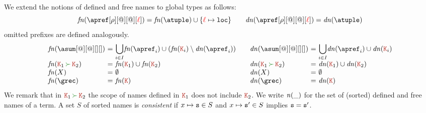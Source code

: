 We extend the notions of defined and free names to global types as
follows:
\[
 \fn{\apref[\arole][@][@][\alocvar]}
 = \fn \atuple \cup \{\alocvar \mapsto \asort[loc]\} 
\qquad
 \dn{\apref[\arole][@][@][\alocvar]} 
 = \dn \atuple 
\]
omitted prefixes are defined analogously.
\[
  \begin{array}{ll}
    \begin{array}{l@{\ =\ } ll}
      \fn{\asum[@][@][][]} & \displaystyle{\bigcup_{i\in I}} \fn{\apref_i} \cup (\fn{\aK_i}\setminus\dn{\apref_i})
      \\
      \fn{\aK_1 \seqop \aK_2} 
                &
                  \fn{\aK_1}\cup\fn{\aK_2}
      \\
      \fn X & \emptyset
      \\
      \fn \grec & \fn {\aK}
    \end{array}
    &
    \begin{array}{l@{\ =\ } ll}
      \dn{\asum[@][@][][]} & \displaystyle{\bigcup_{i\in I}} \dn{\apref_i} \cup \dn{\aK_i}
      \\
      \dn{\aK_1 \seqop \aK_2} 
                           &
                             \dn{\aK_1}\cup\dn{\aK_2}
      \\
      \dn X & \emptyset
      \\
      \dn \grec & \dn {\aK}
    \end{array}
  \end{array}
\]
%
We remark that in $\aK_1 \seqop \aK_2$ the scope of names defined in $\aK_1$ does not include $\aK_2$.
We write ${\it n}(\_)$ for the set of (sorted) defined and free names of a term.
%
A set $S$ of sorted names is \emph{consistent} if
$x\mapsto \mathtt{s} \in S$ and $x\mapsto \mathtt{s}' \in S$ implies
$\mathtt{s} = \mathtt{s}'$.
 
